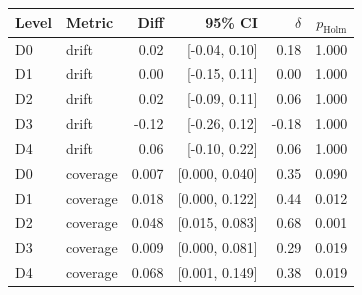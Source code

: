 \begin{tabular}{llrrrr}
\toprule
Level & Metric & Diff & 95\% CI & $\delta$ & $p_{\mathrm{Holm}}$ \\
\midrule
D0 & drift & 0.02 & [-0.04, 0.10] & 0.18 & 1.000 \\
D1 & drift & 0.00 & [-0.15, 0.11] & 0.00 & 1.000 \\
D2 & drift & 0.02 & [-0.09, 0.11] & 0.06 & 1.000 \\
D3 & drift & -0.12 & [-0.26, 0.12] & -0.18 & 1.000 \\
D4 & drift & 0.06 & [-0.10, 0.22] & 0.06 & 1.000 \\
D0 & coverage & 0.007 & [0.000, 0.040] & 0.35 & 0.090 \\
D1 & coverage & 0.018 & [0.000, 0.122] & 0.44 & 0.012 \\
D2 & coverage & 0.048 & [0.015, 0.083] & 0.68 & 0.001 \\
D3 & coverage & 0.009 & [0.000, 0.081] & 0.29 & 0.019 \\
D4 & coverage & 0.068 & [0.001, 0.149] & 0.38 & 0.019 \\
\bottomrule
\end{tabular}